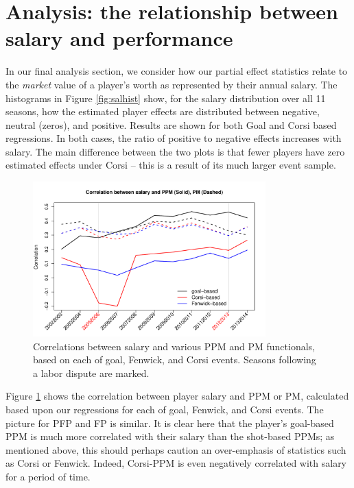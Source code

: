\section{Analysis: the relationship between salary and performance}
\label{sec:salary}

In our final analysis section, we consider how our partial effect statistics relate to the \textit{market} value of a player's worth as represented by their annual salary.
The histograms in Figure \ref{fig:salhist} show, for the salary distribution over all 11 seasons, how the estimated player effects are distributed between negative, neutral (zeros), and positive.  Results are shown for both Goal and Corsi based regressions.  In both cases, the ratio of positive to negative effects increases with salary.  The main difference between the two plots is that fewer players have zero estimated effects under Corsi -- this is a result of its much larger event sample.


\begin{figure}[htb!]
	\centering
	\includegraphics[width=0.8\textwidth]{figures/ppmpmsal-corr-regular.pdf}
	\caption{Correlations between salary and various PPM and PM functionals, based on each of goal, Fenwick, and Corsi events.  Seasons following a labor dispute are marked. }\label{fig:salarycorr}
\end{figure}

Figure \ref{fig:salarycorr} shows the correlation between player salary and PPM or PM, calculated based upon our regressions for each of goal, Fenwick, and Corsi events.  The picture for PFP and FP is similar.  It is clear here that the player's goal-based PPM is much more correlated with their salary than the shot-based PPMs; as mentioned above, this should perhaps caution an over-emphasis of statistics such as Corsi or Fenwick.  Indeed, Corsi-PPM is even negatively correlated with salary for a period of time.

